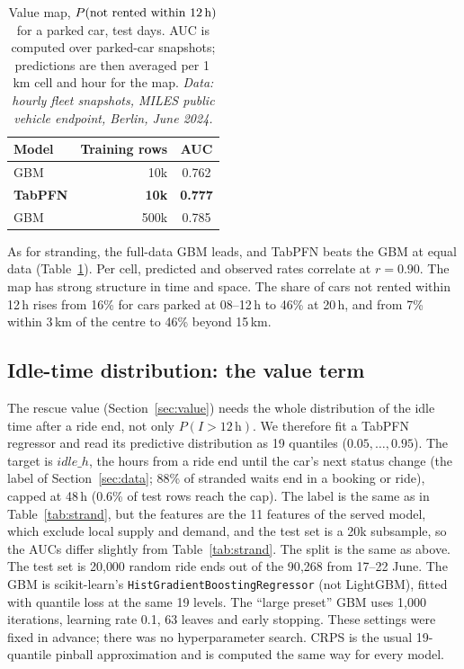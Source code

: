\documentclass[11pt,a4paper]{article}
\begin{document}
\begin{table}[h]
\centering
\caption{Value map, $P(\text{not rented within 12\,h})$ for a parked car, test days. AUC is computed over parked-car snapshots; predictions are then averaged per 1\,km cell and hour for the map. \emph{Data: hourly fleet snapshots, MILES public vehicle endpoint, Berlin, June 2024.}}
\label{tab:value}
\begin{tabular}{lrc}
\toprule
Model & Training rows & AUC \\
\midrule
GBM & 10k & 0.762 \\
\textbf{TabPFN} & \textbf{10k} & \textbf{0.777} \\
GBM & 500k & 0.785 \\
\bottomrule
\end{tabular}
\end{table}

As for stranding, the full-data GBM leads, and TabPFN beats the GBM at equal data (Table~\ref{tab:value}). Per cell, predicted and observed rates correlate at $r = 0.90$. The map has strong structure in time and space. The share of cars not rented within 12\,h rises from 16\% for cars parked at 08--12\,h to 46\% at 20\,h, and from 7\% within 3\,km of the centre to 46\% beyond 15\,km.

\subsection{Idle-time distribution: the value term}\label{sec:idle}

The rescue value (Section~\ref{sec:value}) needs the whole distribution of the idle time after a ride end, not only $P(I>12\,\mathrm{h})$. We therefore fit a TabPFN regressor and read its predictive distribution as 19 quantiles ($0.05,\dots,0.95$). The target is $\mathit{idle\_h}$, the hours from a ride end until the car's next status change (the label of Section~\ref{sec:data}; 88\% of stranded waits end in a booking or ride), capped at 48\,h (0.6\% of test rows reach the cap). The label is the same as in Table~\ref{tab:strand}, but the features are the 11 features of the served model, which exclude local supply and demand, and the test set is a 20k subsample, so the AUCs differ slightly from Table~\ref{tab:strand}. The split is the same as above. The test set is 20{,}000 random ride ends out of the 90{,}268 from 17--22 June. The GBM is scikit-learn's \texttt{HistGradientBoostingRegressor} (not LightGBM), fitted with quantile loss at the same 19 levels. The ``large preset'' GBM uses 1{,}000 iterations, learning rate 0.1, 63 leaves and early stopping. These settings were fixed in advance; there was no hyperparameter search. CRPS is the usual 19-quantile pinball approximation and is computed the same way for every model.
\end{document}
